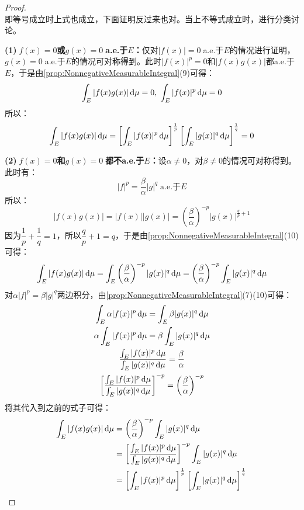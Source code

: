 \begin{proof}
\begin{equation*}
	\end{equation*}
	即等号成立时上式也成立，下面证明反过来也对。当上不等式成立时，进行分类讨论。\par
	\textbf{(1)$\;f(x)=0$或$g(x)=0\;$a.e.于$E$：}仅对$|f(x)|=0\;$a.e.于$E$的情况进行证明，$g(x)=0\;$a.e.于$E$的情况可对称得到。此时$|f(x)|^p=0$和$|f(x)g(x)|$都a.e.于$E$，于是由\cref{prop:NonnegativeMeasurableIntegral}(9)可得：
	\begin{equation*}
		\int_{E}|f(x)g(x)|\mathop{}\!\mathrm{d}\mu=0,\;\int_{E}|f(x)|^p\mathop{}\!\mathrm{d}\mu=0
	\end{equation*}
	所以：
	\begin{equation*}
		\int_{E}^{}|f(x)g(x)|\mathop{}\!\mathrm{d} \mu=\left[\int_{E}^{}|f(x)|^p\mathop{}\!\mathrm{d}\mu\right]^{\frac{1}{p}}\left[\int_{E}^{}|g(x)|^q\mathop{}\!\mathrm{d}\mu\right]^{\frac{1}{q}}=0
	\end{equation*}\par
	\textbf{(2)$\;f(x)=0$和$g(x)=0\;$都不a.e.于$E$：}设$\alpha\ne0$，对$\beta\ne0$的情况可对称得到。此时有：
	\begin{equation*}
		|f|^p=\frac{\beta}{\alpha}|g|^q\;\text{a.e.于$E$}
	\end{equation*}
	所以：
	\begin{equation*}
		|f(x)g(x)|=|f(x)||g(x)|=\left(\frac{\beta}{\alpha}\right)^{-p}|g(x)|^{\frac{q}{p}+1}
	\end{equation*}
	因为$\dfrac{1}{p}+\dfrac{1}{q}=1$，所以$\dfrac{q}{p}+1=q$，于是由\cref{prop:NonnegativeMeasurableIntegral}(10)可得：
	\begin{equation*}
		\int_{E}|f(x)g(x)|\mathop{}\!\mathrm{d}\mu=\int_{E}\left(\frac{\beta}{\alpha}\right)^{-p}|g(x)|^{q}\mathop{}\!\mathrm{d}\mu=\left(\frac{\beta}{\alpha}\right)^{-p}\int_{E}|g(x)|^q\mathop{}\!\mathrm{d}\mu
	\end{equation*}
	对$\alpha|f|^p=\beta|g|^q$两边积分，由\cref{prop:NonnegativeMeasurableIntegral}(7)(10)可得：
	\begin{gather*}
		\int_{E}\alpha|f(x)|^p\dif\mu=\int_{E}\beta |g(x)|^q\dif\mu \\
		\alpha\int_{E}|f(x)|^p\dif\mu=\beta\int_{E}|g(x)|^q\dif\mu \\
		\frac{\int_{E}|f(x)|^p\dif\mu}{\int_{E}|g(x)|^q\dif\mu}=\frac{\beta}{\alpha} \\
		\left[\frac{\int_{E}|f(x)|^p\dif\mu}{\int_{E}|g(x)|^q\dif\mu}\right]^{-p}=\left(\frac{\beta}{\alpha}\right)^{-p}
	\end{gather*}
	将其代入到之前的式子可得：
	\begin{align*}
		\int_{E}|f(x)g(x)|\mathop{}\!\mathrm{d}\mu&=\left(\frac{\beta}{\alpha}\right)^{-p}\int_{E}|g(x)|^q\mathop{}\!\mathrm{d}\mu \\
		&=\left[\frac{\int_{E}|f(x)|^p\mathop{}\!\mathrm{d}\mu}{\int_{E}|g(x)|^q\mathop{}\!\mathrm{d}\mu}\right]^{-p}\int_{E}|g(x)|^q\mathop{}\!\mathrm{d}\mu \\
		&=\left[\int_{E}|f(x)|^p\mathop{}\!\mathrm{d}\mu\right]^{\frac{1}{p}}\left[\int_{E}|g(x)|^q\mathop{}\!\mathrm{d}\mu\right]^{\frac{1}{q}}\qedhere
	\end{align*}
\end{proof}
